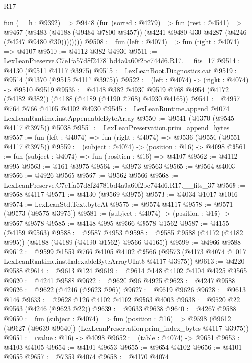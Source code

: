 \begin{lexlean}{R17}
\begin{coremodule}
        fun (__h : @9392) =>
        @9448
          (fun (sorted : @4279) =>
          fun (rest : @4541) =>
          @9467
            (@9483
              (@4188 (@9484 @7800 @9457))
              (@4241 @9480 @30 @4287 (@4246 (@4247 @9480 @30))))))))
@9508 := fun (left : @4074) => fun (right : @4074) => @4107
@9510 := @4112 @382 @4930
@9511 := LexLeanPreserve.C7e1fa57d8f24781bd4a0a60f2bc744d6.R17.__fits_17
@9514 := @4130 (@9511 @4117 @3975)
@9515 := LexLeanBoot.Diagnostics.cat
@9519 := @9514 (@1370 (@9515 @4117 @3975))
@9522 := (left : @4074) -> (right : @4074) -> @9510 @9519
@9536 := @4148
    @382
    @4930
    @9519
    @768
    @4954
    (@4172 (@4182 @382))
    (@4188 (@4189 (@4190 @768) @4930 @4165))
@9541 := @4967 @764 @766 @4105 @4102 @4930
@9545 := LexLeanRuntime.append @4074 LexLeanRuntime.instAppendableByteArray
@9550 := @9541 (@1370 (@9545 @4117 @3975)) @5038
@9551 := LexLeanPreservation.prim_append_bytes
@9557 := fun (left : @4074) => fun (right : @4074) => @9536 (@9550 (@9551 @4117 @3975))
@9559 := (subject : @4074) -> (position : @16) -> @4098
@9561 := fun (subject : @4074) => fun (position : @16) => @4107
@9562 := @4112 @995
@9563 := @161 @3975
@9564 := @3973 @9563
@9565 := @9564 @4003
@9566 := @4926 @9565
@9567 := @9562 @9566
@9568 := LexLeanPreserve.C7e1fa57d8f24781bd4a0a60f2bc744d6.R17.__fits_37
@9569 := @9568 @4117
@9571 := @4130 (@9569 @3975)
@9573 := @4034 @1017 @1016
@9574 := LexLeanStd.Text.byteAt
@9575 := @9574 @4117
@9578 := @9571 (@9573 (@9575 @3975))
@9581 := (subject : @4074) -> (position : @16) -> @9567 @9578
@9585 := @4148 @995 @9566 @9578 @1562
@9587 := @4155 (@4159 @9563)
@9588 := @9587 @4953
@9598 := @9585 @9588 (@4172 (@4182 @995)) (@4188 (@4189 (@4190 @1562) @9566 @4165))
@9599 := @4966 @9588
@9612 := @9599
    @1559
    @766
    @4105
    @4102
    @9566
    (@9573 (@4173 @4074 @1017 LexLeanRuntime.instIndexableByteArrayUInt8 @4117 @3975))
@9613 := @4220 @9588
@9614 := @9613 @124
@9619 := @9614 @148 @4102 @4104 @4925 @9565
@9620 := @4241 @9588
@9622 := @9620 @96 @4925
@9623 := @4247 @9588
@9626 := @9622 (@4246 (@9623 @96))
@9627 := @9619 @9626
@9628 := @9613 @146
@9633 := @9628 @126 @4102 @4102 @9563 @4003
@9638 := @9620 @22 @9563 (@4246 (@9623 @22))
@9639 := @9633 @9638
@9640 := @4267 @9588
@9650 := fun (subject : @4074) =>
  fun (position : @16) =>
  @9598 (@9612 (@9627 (@9639 @9640)) (LexLeanPreservation.prim_index_bytes @4117 @3975))
@9651 := (value : @16) -> @4098
@9652 := (table : @4074) -> @9651
@9653 := @4103 @4105
@9654 := @4101 @9653
@9655 := @9654 @4102
@9656 := @4101 @9655
@9657 := @7359 @4074
@9658 := @4170 @4074

\end{coremodule}
\end{lexlean}
